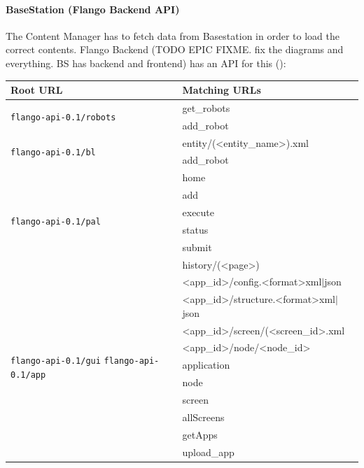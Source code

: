 \paragraph{BaseStation (Flango Backend API)} The Content Manager has to fetch data from Basestation in order to load the correct contents.
Flango Backend (TODO EPIC FIXME. fix the diagrams and everything. BS has backend and frontend) has an API for this ():

\begin{table}[ht]
    \centering
    \begin{tabularx}{\linewidth}{| l | X |}
    \hline
    Root URL & Matching URLs \\
    \hline
    \multirow{2}{*}{\texttt{flango-api-0.1/robots}}
        & get\_robots \\ 
        & add\_robot \\
    \hline 
    
    \multirow{2}{*}{\texttt{flango-api-0.1/bl}} 
        & entity/(\textless entity\_name\textgreater).xml \\ 
        & add\_robot \\
    \hline
    
    \multirow{6}{*}{\texttt{flango-api-0.1/pal}} 
        & home \\
        & add \\
        & execute \\
        & status \\   
        & submit \\
        & history/(\textless page\textgreater) \\
    \hline
    
    \multirow{10}{2.5cm}{\texttt{flango-api-0.1/gui}  \texttt{flango-api-0.1/app}}
        & \textless app\_id\textgreater /config.\textless format\textgreater xml$|$json \\
        & \textless app\_id\textgreater /structure.\textless format\textgreater xml$|$json \\
        & \textless app\_id\textgreater /screen/(\textless screen\_id\textgreater.xml \\
        & \textless app\_id\textgreater /node/\textless node\_id\textgreater \\
        & application \\
        & node \\
        & screen \\
        & allScreens \\
        & getApps \\
        & upload\_app \\
    \hline
    

\end{tabularx}
\end{table}
